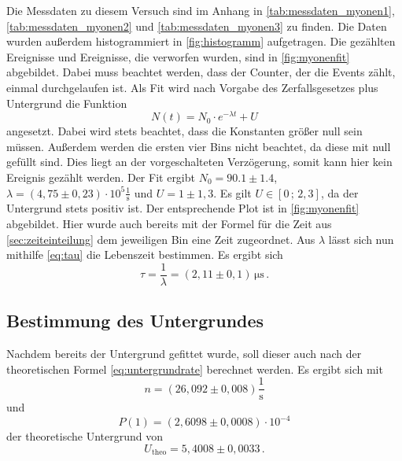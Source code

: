 Die Messdaten zu diesem Versuch sind im Anhang in \autoref{tab:messdaten_myonen1}, \autoref{tab:messdaten_myonen2} und \autoref{tab:messdaten_myonen3} zu finden.
Die Daten wurden außerdem histogrammiert in \autoref{fig:histogramm} aufgetragen.
Die gezählten Ereignisse und Ereignisse, die verworfen wurden, sind in \autoref{fig:myonenfit} abgebildet.
Dabei muss beachtet werden, dass der Counter, der die Events zählt, einmal durchgelaufen ist.
Als Fit wird nach Vorgabe des Zerfallsgesetzes plus Untergrund die Funktion
\begin{equation*}
    N(t) = N_0 \cdot e^{- \lambda t} + U
\end{equation*} 
angesetzt.
Dabei wird stets beachtet, dass die Konstanten größer null sein müssen.
Außerdem werden die ersten vier Bins nicht beachtet, da diese mit null gefüllt sind.
Dies liegt an der vorgeschalteten Verzögerung, somit kann hier kein Ereignis gezählt werden.
Der Fit ergibt $N_0 = 90.1 \pm 1.4$, $\lambda = (4{,}75 \pm 0{,}23) \cdot 10^5 \frac{1}{\unit{\second}}$ und $U = 1 \pm 1{,}3$.
Es gilt $U \in [0 \, ; \, 2{,}3]$, da der Untergrund stets positiv ist.
Der entsprechende Plot ist in \autoref{fig:myonenfit} abgebildet.
Hier wurde auch bereits mit der Formel für die Zeit aus \autoref{sec:zeiteinteilung} dem jeweiligen Bin eine Zeit zugeordnet.
Aus $\lambda$ lässt sich nun mithilfe \autoref{eq:tau} die Lebenszeit bestimmen.
Es ergibt sich
\begin{equation}
    \tau = \frac{1}{\lambda} = (2{,}11\pm 0{,}1) \, \unit{\micro\second} \, .
\end{equation}

\subsection{Bestimmung des Untergrundes} \label{sec:untergrund_ausw}

Nachdem bereits der Untergrund gefittet wurde, soll dieser auch nach der theoretischen Formel \autoref{eq:untergrundrate} berechnet werden.
Es ergibt sich mit
\begin{equation*}
    n = (26{,}092\pm0{,}008) \frac{1}{\unit\second}
\end{equation*}
und
\begin{equation*}
    P(1) = (2{,}6098 \pm 0{,}0008) \cdot 10^{-4}
\end{equation*}
der theoretische Untergrund von
\begin{equation*}
    U_\text{theo} = 5{,}4008 \pm 0{,}0033 \, .
\end{equation*}